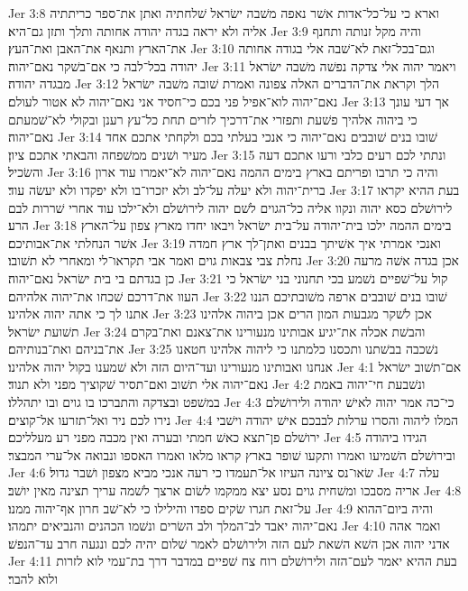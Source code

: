 Jer 3:8  וארא כי על־כל־אדות אשׁר נאפה משׁבה ישׂראל שׁלחתיה ואתן את־ספר כריתתיה אליה ולא יראה בגדה יהודה אחותה ותלך ותזן גם־היא׃
Jer 3:9  והיה מקל זנותה ותחנף את־הארץ ותנאף את־האבן ואת־העץ׃
Jer 3:10  וגם־בכל־זאת לא־שׁבה אלי בגודה אחותה יהודה בכל־לבה כי אם־בשׁקר נאם־יהוה׃
Jer 3:11  ויאמר יהוה אלי צדקה נפשׁה משׁבה ישׂראל מבגדה יהודה׃
Jer 3:12  הלך וקראת את־הדברים האלה צפונה ואמרת שׁובה משׁבה ישׂראל נאם־יהוה לוא־אפיל פני בכם כי־חסיד אני נאם־יהוה לא אטור לעולם׃
Jer 3:13  אך דעי עונך כי ביהוה אלהיך פשׁעת ותפזרי את־דרכיך לזרים תחת כל־עץ רענן ובקולי לא־שׁמעתם נאם־יהוה׃
Jer 3:14  שׁובו בנים שׁובבים נאם־יהוה כי אנכי בעלתי בכם ולקחתי אתכם אחד מעיר ושׁנים ממשׁפחה והבאתי אתכם ציון׃
Jer 3:15  ונתתי לכם רעים כלבי ורעו אתכם דעה והשׂכיל׃
Jer 3:16  והיה כי תרבו ופריתם בארץ בימים ההמה נאם־יהוה לא־יאמרו עוד ארון ברית־יהוה ולא יעלה על־לב ולא יזכרו־בו ולא יפקדו ולא יעשׂה עוד׃
Jer 3:17  בעת ההיא יקראו לירושׁלם כסא יהוה ונקוו אליה כל־הגוים לשׁם יהוה לירושׁלם ולא־ילכו עוד אחרי שׁררות לבם הרע׃
Jer 3:18  בימים ההמה ילכו בית־יהודה על־בית ישׂראל ויבאו יחדו מארץ צפון על־הארץ אשׁר הנחלתי את־אבותיכם׃
Jer 3:19  ואנכי אמרתי איך אשׁיתך בבנים ואתן־לך ארץ חמדה נחלת צבי צבאות גוים ואמר אבי תקראו־לי ומאחרי לא תשׁובו׃
Jer 3:20  אכן בגדה אשׁה מרעה כן בגדתם בי בית ישׂראל נאם־יהוה׃
Jer 3:21  קול על־שׁפיים נשׁמע בכי תחנוני בני ישׂראל כי העוו את־דרכם שׁכחו את־יהוה אלהיהם׃
Jer 3:22  שׁובו בנים שׁובבים ארפה משׁובתיכם הננו אתנו לך כי אתה יהוה אלהינו׃
Jer 3:23  אכן לשׁקר מגבעות המון הרים אכן ביהוה אלהינו תשׁועת ישׂראל׃
Jer 3:24  והבשׁת אכלה את־יגיע אבותינו מנעורינו את־צאנם ואת־בקרם את־בניהם ואת־בנותיהם׃
Jer 3:25  נשׁכבה בבשׁתנו ותכסנו כלמתנו כי ליהוה אלהינו חטאנו אנחנו ואבותינו מנעורינו ועד־היום הזה ולא שׁמענו בקול יהוה אלהינו׃
Jer 4:1  אם־תשׁוב ישׂראל נאם־יהוה אלי תשׁוב ואם־תסיר שׁקוציך מפני ולא תנוד׃
Jer 4:2  ונשׁבעת חי־יהוה באמת במשׁפט ובצדקה והתברכו בו גוים ובו יתהללו׃
Jer 4:3  כי־כה אמר יהוה לאישׁ יהודה ולירושׁלם נירו לכם ניר ואל־תזרעו אל־קוצים׃
Jer 4:4  המלו ליהוה והסרו ערלות לבבכם אישׁ יהודה וישׁבי ירושׁלם פן־תצא כאשׁ חמתי ובערה ואין מכבה מפני רע מעלליכם׃
Jer 4:5  הגידו ביהודה ובירושׁלם השׁמיעו ואמרו ותקעו שׁופר בארץ קראו מלאו ואמרו האספו ונבואה אל־ערי המבצר׃
Jer 4:6  שׂאו־נס ציונה העיזו אל־תעמדו כי רעה אנכי מביא מצפון ושׁבר גדול׃
Jer 4:7  עלה אריה מסבכו ומשׁחית גוים נסע יצא ממקמו לשׂום ארצך לשׁמה עריך תצינה מאין יושׁב׃
Jer 4:8  על־זאת חגרו שׂקים ספדו והילילו כי לא־שׁב חרון אף־יהוה ממנו׃
Jer 4:9  והיה ביום־ההוא נאם־יהוה יאבד לב־המלך ולב השׂרים ונשׁמו הכהנים והנביאים יתמהו׃
Jer 4:10  ואמר אהה אדני יהוה אכן השׁא השׁאת לעם הזה ולירושׁלם לאמר שׁלום יהיה לכם ונגעה חרב עד־הנפשׁ׃
Jer 4:11  בעת ההיא יאמר לעם־הזה ולירושׁלם רוח צח שׁפיים במדבר דרך בת־עמי לוא לזרות ולוא להבר׃
